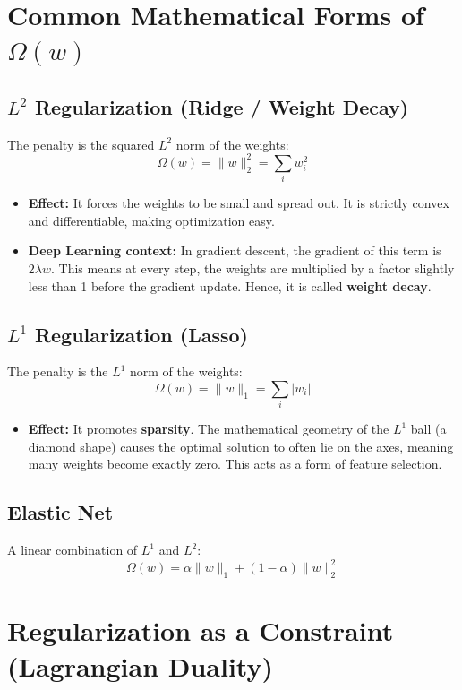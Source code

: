 \documentclass[11pt]{article}
\begin{document}
\hrulefill

\section{Common Mathematical Forms of \(\Omega(w)\)}

\subsection{\(L^2\) Regularization (Ridge / Weight Decay)}
The penalty is the squared \(L^2\) norm of the weights:
\[
 \Omega(w) = \|w\|_2^2 = \sum_{i} w_i^2 
\]
\begin{itemize}
    \item \textbf{Effect:} It forces the weights to be small and spread out. It is strictly convex and differentiable, making optimization easy.
    \item \textbf{Deep Learning context:} In gradient descent, the gradient of this term is \(2\lambda w\). This means at every step, the weights are multiplied by a factor slightly less than 1 before the gradient update. Hence, it is called \textbf{weight decay}.
\end{itemize}

\subsection{\(L^1\) Regularization (Lasso)}
The penalty is the \(L^1\) norm of the weights:
\[
 \Omega(w) = \|w\|_1 = \sum_{i} |w_i| 
\]
\begin{itemize}
    \item \textbf{Effect:} It promotes \textbf{sparsity}. The mathematical geometry of the \(L^1\) ball (a diamond shape) causes the optimal solution to often lie on the axes, meaning many weights become exactly zero. This acts as a form of feature selection.
\end{itemize}

\subsection{Elastic Net}
A linear combination of \(L^1\) and \(L^2\):
\[
 \Omega(w) = \alpha \|w\|_1 + (1-\alpha) \|w\|_2^2 
\]

\hrulefill

\section{Regularization as a Constraint (Lagrangian Duality)}
\end{document}

